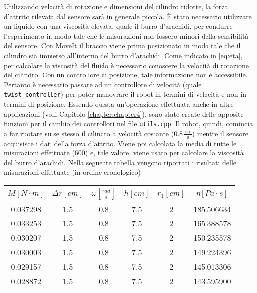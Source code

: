 Utilizzando velocit\`{a} di rotazione e dimensioni del cilindro ridotte, la forza d'attrito rilevata dal sensore sar\`{a} in generale 
piccola. \`{E} stato necessario utilizzare un liquido con una viscosit\`{a} elevata, quale il burro d'arachidi, per condurre l'esperimento in modo tale 
che le misurazioni non fossero minori della sensibilit\`{a} del sensore. 
Con MoveIt il braccio viene prima posizionato in modo tale che il cilindro sia immerso all'interno del burro d'arachidi. 
Come indicato in \ref{eq:eta}, per calcolare la viscosit\`{a} del fluido \`{e} necessario conoscere 
la velocit\`{a} di rotazione del cilindro. Con un controllore di posizione, tale informazione non \`{e} accessibile. 
Pertanto \`{e} necessario passare ad un controllore di velocit\`{a} (quale \verb|twist_controller|) per poter manovrare il robot in 
termini di velocit\`{a} e non in termini di posizione. Essendo questa un'operazione effettuata anche in altre applicazioni (vedi  
Capitolo \ref{chapter:chapter4}), sono state create delle apposite funzioni per il cambio dei controllori nel file \verb|utils.cpp|. 
Il robot, quindi, comincia a far ruotare su se stesso il cilindro a velocit\`{a} costante ($0.8 \, \frac{\text{rad}}{\text{s}}$) mentre 
il sensore acquisisce i dati della forza d'attrito. 
Viene poi calcolata la media di tutte le misurazioni effettuate (600) e, tale valore, viene usato per calcolare la viscosit\`{a} 
del burro d'arachidi. 
Nella seguente tabella vengono riportati i risultati delle misurazioni effettuate (in ordine cronologico)
\begin{center}
    \begin{tabular}{ ||c|c|c|c|c|c|| } 
     \hline
     $M \left[N \cdot m\right]$ & $\Delta r \left[cm\right]$ & $\omega \left[\frac{rad}{s}\right]$ & $h \left[cm\right]$ & $r_{1} \left[cm\right]$ & $\eta \left[Pa \cdot s\right]$\\
     \hline\hline 
     0.037298 & 1.5 & 0.8 & 7.5 & 2 & 185.506634 \\ 
     0.033253 & 1.5 & 0.8 & 7.5 & 2 & 165.388578 \\ 
     0.030207 & 1.5 & 0.8 & 7.5 & 2 & 150.235578 \\ 
     0.030003 & 1.5 & 0.8 & 7.5 & 2 & 149.224396 \\ 
     0.029157 & 1.5 & 0.8 & 7.5 & 2 & 145.013306 \\ 
     0.028872 & 1.5 & 0.8 & 7.5 & 2 & 143.595900 \\ 
     \hline
    \end{tabular}
\end{center}
